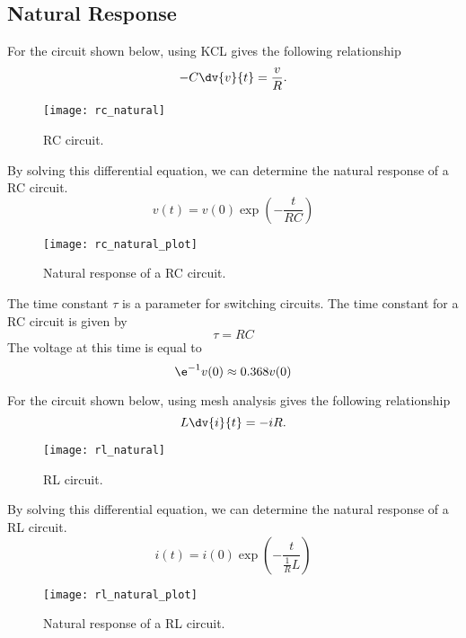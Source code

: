 \documentclass{article}
\begin{document}
\subsection{Natural Response}
\begin{definition}
    For the circuit shown below, using KCL gives the following relationship
    \begin{equation*}
        -C \dv{v}{t} = \frac{v}{R}.
    \end{equation*}
    \begin{figure}[H]
        \centering
        \texttt{[image: rc\_natural]}
        \caption{RC circuit.}
    \end{figure}
    By solving this differential equation, we can determine the natural response of a
    RC circuit.
    \begin{equation*}
        v(t) = v(0)\exp{\left( -\frac{t}{RC} \right)}
    \end{equation*}
    \begin{figure}[H]
        \centering
        \texttt{[image: rc\_natural\_plot]}
        \caption{Natural response of a RC circuit.}
    \end{figure}
\end{definition}
\begin{definition}
    The time constant $\tau$ is a parameter for switching circuits. The time constant for a RC circuit is given by
    \begin{equation*}
        \tau = RC
    \end{equation*}
    The voltage at this time is equal to
    \begin{equation*}
        \e^{-1}v(0) \approx 0.368v(0)
    \end{equation*}
\end{definition}
\begin{definition}
    For the circuit shown below, using mesh analysis gives the following relationship
    \begin{equation*}
        L \dv{i}{t} = -iR.
    \end{equation*}
    \begin{figure}[H]
        \centering
        \texttt{[image: rl\_natural]}
        \caption{RL circuit.}
    \end{figure}
    By solving this differential equation, we can determine the natural response of a
    RL circuit.
    \begin{equation*}
        i(t) = i(0)\exp{\left( -\frac{t}{\frac{1}{R}L} \right)}
    \end{equation*}
    \begin{figure}[H]
        \centering
        \texttt{[image: rl\_natural\_plot]}
        \caption{Natural response of a RL circuit.}
    \end{figure}
\end{definition}
\end{document}
